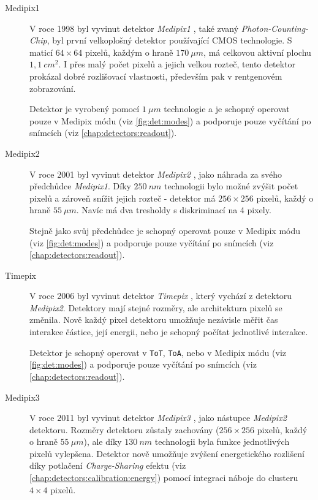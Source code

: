 \begin{description}

	\item[Medipix1] V roce 1998 byl vyvinut detektor \textit{Medipix1} \cite{medipix1}, také zvaný \textit{Photon-Counting-Chip}, byl první velkoplošný detektor používající CMOS technologie. S maticí $64\times64$ pixelů, každým o hraně $170~\mu m$, má celkovou aktivní plochu $1,1~cm^2$. I přes malý počet pixelů a jejich velkou rozteč, tento detektor prokázal dobré rozlišovací vlastnosti, především pak v rentgenovém zobrazování. 
	
	Detektor je vyrobený pomocí $1~\mu m$ technologie a je schopný operovat pouze v Medipix módu (viz \ref{fig:det:modes}) a podporuje pouze vyčítání po snímcích (viz \ref{chap:detectors:readout}).
	
	\item[Medipix2] V roce 2001 byl vyvinut detektor \textit{Medipix2} \cite{medipix2}, jako náhrada za svého předchůdce \textit{Medipix1}. Díky $250~nm$ technologii bylo možné zvýšit počet pixelů a zároveň snížit jejich rozteč - detektor má $256\times256$ pixelů, každý o hraně $55~\mu m$. Navíc má dva tresholdy s diskriminací na 4 pixely. 
	
	Stejně jako svůj předchůdce je schopný operovat pouze v Medipix módu (viz \ref{fig:det:modes}) a podporuje pouze vyčítání po snímcích (viz \ref{chap:detectors:readout}).
	
	\item[Timepix] V roce 2006 byl vyvinut detektor \textit{Timepix} \cite{timepix}, který vychází z detektoru \textit{Medipix2}. Detektory mají stejné rozměry, ale architektura pixelů se změnila. Nově každý pixel detektoru umožňuje nezávisle měřit čas interakce částice, její energii, nebo je schopný počítat jednotlivé interakce. 
	
	Detektor je schopný operovat v \texttt{ToT}, \texttt{ToA}, nebo v Medipix módu (viz \ref{fig:det:modes}) a podporuje pouze vyčítání po snímcích (viz \ref{chap:detectors:readout}).
	
	\item[Medipix3] V roce 2011 byl vyvinut detektor \textit{Medipix3} \cite{medipix3}, jako nástupce \textit{Medipix2} detektoru. Rozměry detektoru zůstaly zachovány ($256\times256$ pixelů, každý o hraně $55~\mu m$), ale díky $130~nm$ technologii byla funkce jednotlivých pixelů vylepšena. Detektor nově umožňuje zvýšení energetického rozlišení díky potlačení \textit{Charge-Sharing} efektu (viz \ref{chap:detectors:calibration:energy}) pomocí integraci náboje do clusteru $4\times4$ pixelů. 
	

\end{description}
